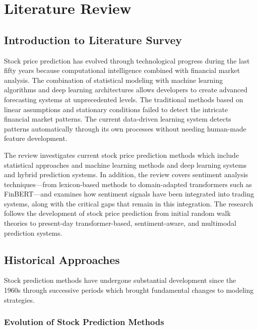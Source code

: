 \section{Literature Review}

\subsection{Introduction to Literature Survey}
Stock price prediction has evolved through technological progress during the last fifty years because computational intelligence combined with financial market analysis. The combination of statistical modeling with machine learning algorithms and deep learning architectures allows developers to create advanced forecasting systems at unprecedented levels. The traditional methods based on linear assumptions and stationary conditions failed to detect the intricate financial market patterns. The current data-driven learning system detects patterns automatically through its own processes without needing human-made feature development.


The review investigates current stock price prediction methods which include statistical approaches and machine learning methods and deep learning systems and hybrid prediction systems. In addition, the review covers sentiment analysis techniques---from lexicon-based methods to domain-adapted transformers such as FinBERT---and examines how sentiment signals have been integrated into trading systems, along with the critical gaps that remain in this integration. The research follows the development of stock price prediction from initial random walk theories to present-day transformer-based, sentiment-aware, and multimodal prediction systems.

\subsection{Historical Approaches}

Stock prediction methods have undergone substantial development since the 1960s through successive periods which brought fundamental changes to modeling strategies.

\subsubsection{Evolution of Stock Prediction Methods}

